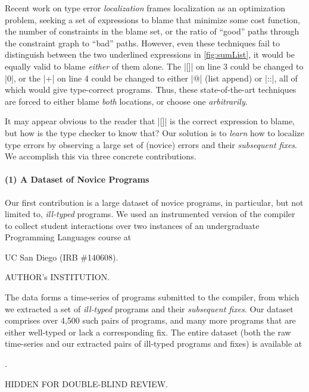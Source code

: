 Recent work on type error \emph{localization}
%
\citep[\eg][]{Zhang2014-lv,Loncaric2016-uk,Pavlinovic2014-mr}
%
frames localization as an optimization problem, seeking a set of
expressions to blame that minimize some cost function, \eg the number of
constraints in the blame set, or the ratio of ``good'' paths through the
constraint graph to ``bad'' paths.
%
However, even these techniques fail to distinguish between the two
underlined expressions in \autoref{fig:sumList}, it would be equally
valid to blame \emph{either} of them alone.
%
The |[]| on line 3 could be changed to |0|, or the |+| on line 4 could
be changed to either |@| (list append) or |::|, all of which would give
type-correct programs.
%
Thus, these state-of-the-art techniques are forced to either blame
\emph{both} locations, or choose one \emph{arbitrarily}.

It may appear obvious to the reader that |[]| is the correct expression
to blame, but how is the type checker to know that?
%
Our solution is to \emph{learn} how to localize type errors by observing
a large set of (novice) errors and their \emph{subsequent fixes}.
%
We accomplish this via three concrete contributions.

\paragraph{\textbf{(1) A Dataset of Novice \ocaml Programs}}
Our first contribution is a large dataset of novice \ocaml programs,
in particular, but not limited to, \emph{ill-typed} programs.
%
We used an instrumented version of the \ocaml compiler to collect
student interactions over two instances of an undergraduate Programming
Languages course at
%
\begin{anonsuppress}
UC San Diego (IRB \#140608).
\end{anonsuppress}
\begin{noanonsuppress}
AUTHOR's INSTITUTION.
\end{noanonsuppress}
%
The data forms a time-series of programs submitted to the \ocaml
compiler, from which we extracted a set of \emph{ill-typed} programs
and their \emph{subsequent fixes}.
%
Our dataset comprises over 4,500 such pairs of programs, and many more
programs that are either well-typed or lack a corresponding fix.
%
The entire dataset (both the raw time-series and our extracted pairs of
ill-typed programs and fixes) is available at
%
\begin{anonsuppress}
.
\end{anonsuppress}
\begin{noanonsuppress}
HIDDEN FOR DOUBLE-BLIND REVIEW.
\end{noanonsuppress}
%

